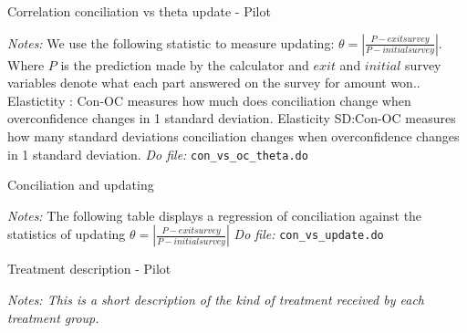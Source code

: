 \documentclass[11pt]{article}
\begin{document}
\begin{table}[H]
    \caption{Correlation conciliation vs theta update - Pilot}
    \label{Table_concvsoc_theta}
    \begin{center}
        \scriptsize{}
    \end{center}
    \footnotesize
    \textit{Notes:} 
   We use the following statistic to measure updating: $\theta=\left|\frac{P-exitsurvey}{P-initialsurvey}\right|$. Where $P$ is the prediction made by the calculator and $exit$ and $initial$ survey variables denote what each part answered on the survey for amount won.. Elastictity : Con-OC measures how much does conciliation change when overconfidence changes in 1 standard deviation. Elasticity SD:Con-OC measures how many standard deviations conciliation changes when  overconfidence changes in 1 standard deviation.
    \textit{Do file: } \texttt{con\_vs\_oc\_theta.do}
\end{table}


\pagebreak

\begin{landscape}
\begin{table}[H]
    \caption{Conciliation and updating}
    \label{Con_update}
    \begin{center}
        \scriptsize{}
    \end{center}
    \footnotesize
    \textit{Notes:} 
   The following table displays a regression of conciliation against the statistics of updating $\theta=\left|\frac{P-exitsurvey}{P-initialsurvey}\right|$
    \textit{Do file: } \texttt{con\_vs\_update.do}
\end{table}
\end{landscape}



\begin{table}[H]
   \caption{Treatment description - Pilot}
    \label{treatment_description}
    \begin{center}
    \scriptsize{}
    \end{center}
    \footnotesize
    \textit{Notes: This is a short description of the kind of treatment received by each treatment group.} 
\end{table}
\end{document}

